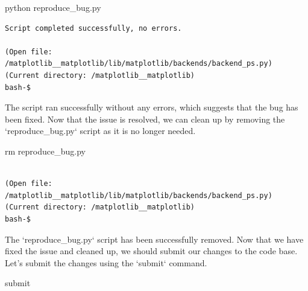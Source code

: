 {\begin{agentbox}
\hrulefill
\begin{CodeVerbatim}[breaklines=true, breakanywhere=true]
python reproduce_bug.py
\end{CodeVerbatim}
\end{agentbox}
\begin{observationbox}\begin{Verbatim}[breaklines=true, breakanywhere=true]
Script completed successfully, no errors.

(Open file: /matplotlib__matplotlib/lib/matplotlib/backends/backend_ps.py)
(Current directory: /matplotlib__matplotlib)
bash-$
\end{Verbatim}
\end{observationbox}
\begin{agentbox}
The script ran successfully without any errors, which suggests that the bug has been fixed. Now that the issue is resolved, we can clean up by removing the `reproduce\_bug.py` script as it is no longer needed.

\hrulefill
\begin{CodeVerbatim}[breaklines=true, breakanywhere=true]
rm reproduce_bug.py
\end{CodeVerbatim}
\end{agentbox}
\begin{observationbox}\begin{Verbatim}[breaklines=true, breakanywhere=true]

(Open file: /matplotlib__matplotlib/lib/matplotlib/backends/backend_ps.py)
(Current directory: /matplotlib__matplotlib)
bash-$
\end{Verbatim}
\end{observationbox}
\begin{agentbox}
The `reproduce\_bug.py` script has been successfully removed. Now that we have fixed the issue and cleaned up, we should submit our changes to the code base. Let's submit the changes using the `submit` command.

\hrulefill
\begin{CodeVerbatim}[breaklines=true, breakanywhere=true]
submit
\end{CodeVerbatim}
\end{agentbox}
\begin{observationbox}\begin{CodeVerbatim}[breaklines=true, breakanywhere=true]


\end{CodeVerbatim}
\end{observationbox}}
